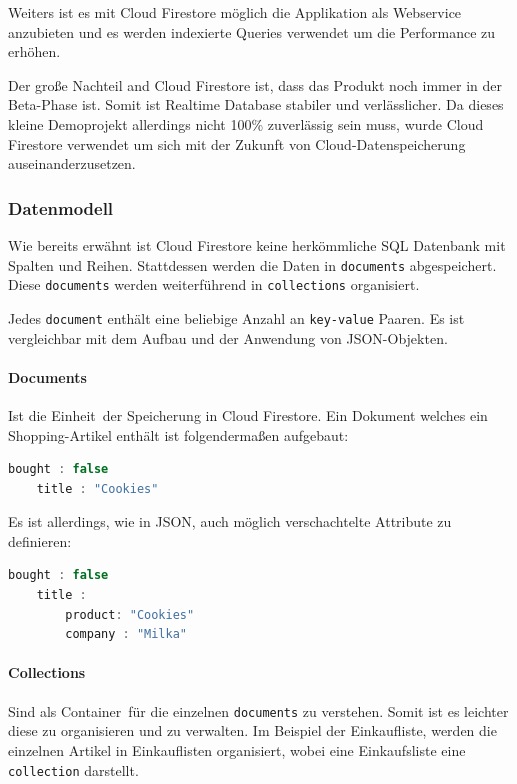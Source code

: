 Weiters ist es mit Cloud Firestore möglich die Applikation als Webservice anzubieten und es werden indexierte Queries verwendet um die Performance zu erhöhen.

Der große Nachteil and Cloud Firestore ist, dass das Produkt noch immer in der Beta-Phase ist. Somit ist Realtime Database stabiler und verlässlicher. Da dieses kleine Demoprojekt allerdings nicht 100\% zuverlässig sein muss, wurde Cloud Firestore verwendet um sich mit der Zukunft von Cloud-Datenspeicherung auseinanderzusetzen. \cite{ChooseaD34:online}
\subsubsection{Datenmodell}
Wie bereits erwähnt ist Cloud Firestore keine herkömmliche SQL Datenbank mit Spalten und Reihen. Stattdessen werden die Daten in \verb|documents| abgespeichert. Diese \verb|documents| werden weiterführend in \verb|collections| organisiert.

Jedes \verb|document| enthält eine beliebige Anzahl an \verb|key-value| Paaren. Es ist vergleichbar mit dem Aufbau und der Anwendung von JSON-Objekten.\cite{CloudFir12:online} 

\paragraph{Documents} 
Ist die \glqq Einheit\grqq\ der Speicherung in Cloud Firestore. Ein Dokument welches ein Shopping-Artikel enthält ist folgendermaßen aufgebaut:

\begin{lstlisting}[language=java]
	bought : false
	title : "Cookies"
\end{lstlisting}

Es ist allerdings, wie in JSON, auch möglich verschachtelte Attribute zu definieren:

\begin{lstlisting}[language=java]
	bought : false
	title :
		product: "Cookies"
		company : "Milka"
\end{lstlisting}

\cite[Abs. Documents]{CloudFir12:online}
\paragraph{Collections}
Sind als \glqq Container\grqq\ für die einzelnen \verb|documents| zu verstehen. Somit ist es leichter diese zu organisieren und zu verwalten. Im Beispiel der Einkaufliste, werden die einzelnen Artikel in Einkauflisten organisiert, wobei eine Einkaufsliste eine \verb|collection| darstellt. \cite[Abs. Collections]{CloudFir12:online}
